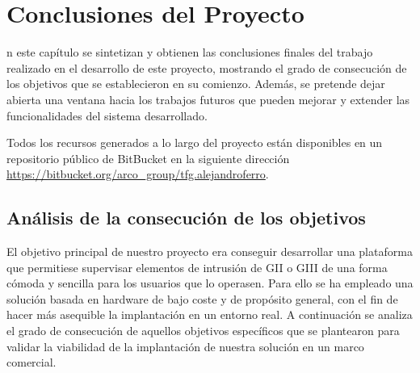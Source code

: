 \chapter{Conclusiones del Proyecto}
\label{chap:conclusiones}

n este capítulo se sintetizan y obtienen las conclusiones finales del trabajo realizado en el desarrollo de este proyecto, mostrando el grado de consecución de los objetivos que se establecieron en su comienzo. Además, se pretende dejar abierta una ventana hacia los trabajos futuros que pueden mejorar y extender las funcionalidades del sistema desarrollado. 

Todos los recursos generados a lo largo del proyecto están disponibles en un repositorio público de BitBucket en la siguiente dirección \url{https://bitbucket.org/arco_group/tfg.alejandroferro}.

\section{Análisis de la consecución de los objetivos}

El objetivo principal de nuestro proyecto era conseguir desarrollar una plataforma que permitiese supervisar
elementos de intrusión de \acs{GII} o \acs{GIII} de una forma cómoda y sencilla para los usuarios que lo operasen. Para ello se ha empleado una solución basada en hardware de bajo coste y de propósito general, con el fin de hacer más asequible la implantación en un entorno real. A continuación se analiza el grado de consecución de aquellos objetivos específicos que se plantearon para validar la viabilidad de la implantación de nuestra solución en un marco comercial.

